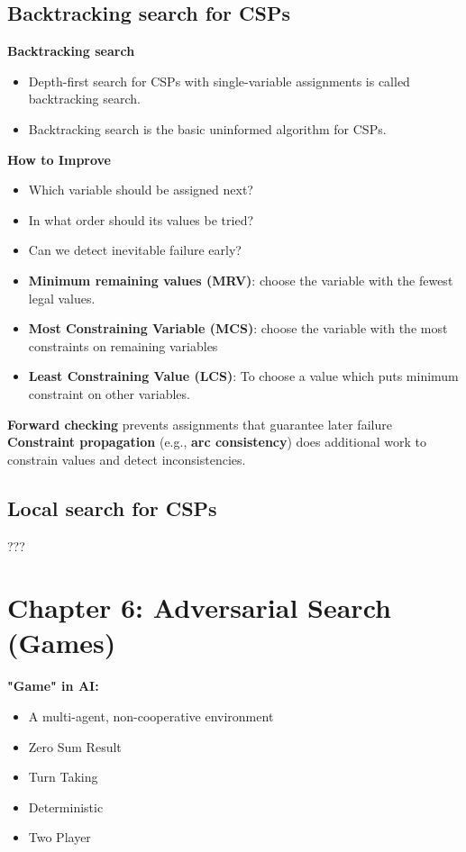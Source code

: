\documentclass{../cheat}
\begin{document}
\begin{multicols}{3}
		\subsection{Backtracking search for CSPs}
		\textbf{Backtracking search}
		\begin{itemize}
			\item Depth-first search for CSPs with single-variable assignments is called backtracking search.
			\item Backtracking search is the basic uninformed algorithm for CSPs.
		\end{itemize}
		
		\textbf{How to Improve}
		\begin{itemize}
			\item Which variable should be assigned next?
			\item In what order should its values be tried?
			\item Can we detect inevitable failure early?
		\end{itemize}
		\begin{itemize}
			\item [\checkmark] \textbf{Minimum remaining values (MRV)}: choose the variable with the fewest legal values.
			\item [\checkmark] \textbf{Most Constraining Variable (MCS)}: choose the variable with the most constraints on remaining variables
			\item [\checkmark] \textbf{Least Constraining Value (LCS)}: To choose a value which puts minimum constraint on other variables.
		\end{itemize}
		
		\textbf{Forward checking} prevents assignments that guarantee later failure\\
		\textbf{Constraint propagation} (e.g., \textbf{arc consistency}) does additional work to constrain values and detect inconsistencies.
		
		\subsection{Local search for CSPs}
		???			

	\section{Chapter 6: Adversarial Search (Games)}
		\textbf{"Game" in AI:}
		\begin{itemize}
			\item A multi-agent, non-cooperative environment
			\item Zero Sum Result
			\item Turn Taking
			\item Deterministic
			\item Two Player
		\end{itemize}
		

\end{multicols}
\end{document}
